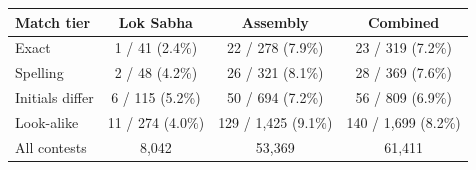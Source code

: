\begin{tabular}{lccc}
\toprule
Match tier & Lok Sabha & Assembly & Combined \\
\midrule
Exact & 1 / 41 (2.4\%) & 22 / 278 (7.9\%) & 23 / 319 (7.2\%) \\
Spelling & 2 / 48 (4.2\%) & 26 / 321 (8.1\%) & 28 / 369 (7.6\%) \\
Initials differ & 6 / 115 (5.2\%) & 50 / 694 (7.2\%) & 56 / 809 (6.9\%) \\
Look-alike & 11 / 274 (4.0\%) & 129 / 1,425 (9.1\%) & 140 / 1,699 (8.2\%) \\
\midrule
All contests & 8,042 & 53,369 & 61,411 \\
\bottomrule
\end{tabular}
